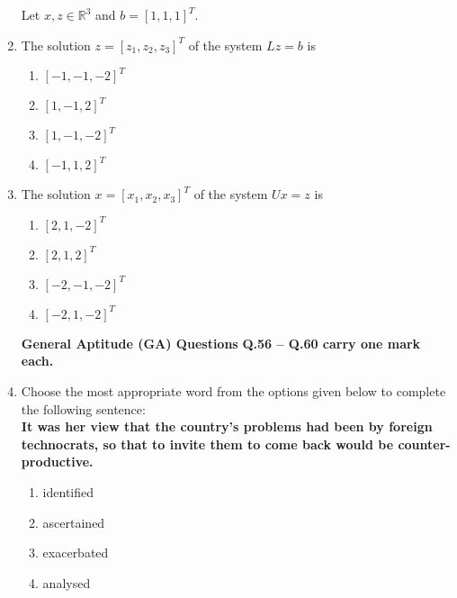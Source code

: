 \documentclass[journal]{IEEEtran}
\numberwithin{equation}{enumi}
\numberwithin{figure}{enumi}
\begin{document}
\begin{enumerate}
Let $x, z \in \mathbb{R}^3$ and $b = [1, 1, 1]^T$.

\item The solution $z = [z_1, z_2, z_3]^T$ of the system $Lz = b$ is
\hfill{}
\begin{multicols}{4}
\begin{enumerate}
   \item $[-1, -1, -2]^T$
   \item $[1, -1, 2]^T$
   \item $[1, -1, -2]^T$
    \item $[-1, 1, 2]^T$
\end{enumerate}
\end{multicols}




\item The solution $x = [x_1, x_2, x_3]^T$ of the system $Ux = z$ is
\hfill{}
\begin{multicols}{4}
\begin{enumerate}
   \item $[2, 1, -2]^T$
   \item $[2, 1, 2]^T$
   \item $[-2, -1, -2]^T$
    \item $[-2, 1, -2]^T$
\end{enumerate}
\end{multicols}


\vspace{1em}
\textbf{General Aptitude (GA) Questions}
\newline
\textbf{Q.56 -- Q.60 carry one mark each.}\\


\item Choose the most appropriate word from the options given below to complete the following sentence:\\
\textbf{It was her view that the country's problems had been \underline{\hspace{2cm}} by foreign technocrats, so that to invite them to come back would be counter-productive.}
\hfill{}
\begin{enumerate}
    \item identified
     \item ascertained
     \item exacerbated
     \item analysed
\end{enumerate}
    


\end{enumerate}
\end{document}
